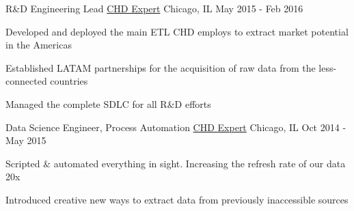 \begin{cventries}
  \cventry
    {R\&D Engineering Lead} %
    {\href{https://www.chd-expert.com}{CHD Expert}} %
    {Chicago, IL} %
    {May 2015 - Feb 2016} %
    {
      \begin{cvitems} %
        \item {Developed and deployed the main ETL CHD employs to extract market potential in the Americas}
        \item {Established LATAM partnerships for the acquisition of raw data from the less-connected countries}
        \item {Managed the complete SDLC for all R\&D efforts}
      \end{cvitems}
    }
  \cventry
    {Data Science Engineer, Process Automation} %
    {\href{https://www.chd-expert.com}{CHD Expert}} %
    {Chicago, IL} %
    {Oct 2014 - May 2015} %
    {
      \begin{cvitems} %
        \item {Scripted \& automated everything in sight. Increasing the refresh rate of our data 20x}
        \item {Introduced creative new ways to extract data from previously inaccessible sources}
      \end{cvitems}
    }
\end{cventries}
